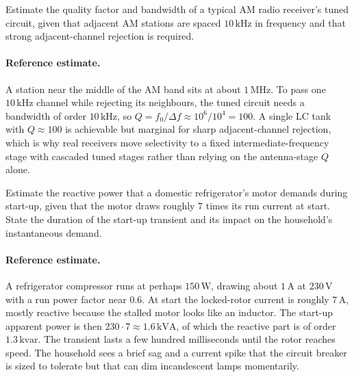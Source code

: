 \begin{exercise}
Estimate the quality factor and bandwidth of a typical AM radio
receiver's tuned circuit, given that adjacent AM stations are spaced
$10\,\si{\kilo\hertz}$ in frequency and that strong adjacent-channel
rejection is required.
\paragraph{Reference estimate.}
A station near the middle of the AM band sits at about
$1\,\si{\mega\hertz}$. To pass one $10\,\si{\kilo\hertz}$ channel while
rejecting its neighbours, the tuned circuit needs a bandwidth of order
$10\,\si{\kilo\hertz}$, so $Q = f_{0}/\Delta f \approx 10^{6}/10^{4} =
100$. A single LC tank with $Q\approx 100$ is achievable but marginal
for sharp adjacent-channel rejection, which is why real receivers move
selectivity to a fixed intermediate-frequency stage with cascaded tuned
stages rather than relying on the antenna-stage $Q$ alone.
\end{exercise}

\begin{exercise}
Estimate the reactive power that a domestic refrigerator's motor
demands during start-up, given that the motor draws roughly $7$ times
its run current at start. State the duration of the start-up
transient and its impact on the household's instantaneous demand.
\paragraph{Reference estimate.}
A refrigerator compressor runs at perhaps $150\,\si{\watt}$, drawing
about $1\,\si{\ampere}$ at $230\,\si{\volt}$ with a run power factor near
$0.6$. At start the locked-rotor current is roughly $7\,\si{\ampere}$,
mostly reactive because the stalled motor looks like an inductor. The
start-up apparent power is then $230\cdot 7 \approx 1.6\,\si{\kilo\volt
\ampere}$, of which the reactive part is of order $1.3\,\text{kvar}$.
The transient lasts a few hundred milliseconds until the rotor reaches
speed. The household sees a brief sag and a current spike that the
circuit breaker is sized to tolerate but that can dim incandescent
lamps momentarily.
\end{exercise}

